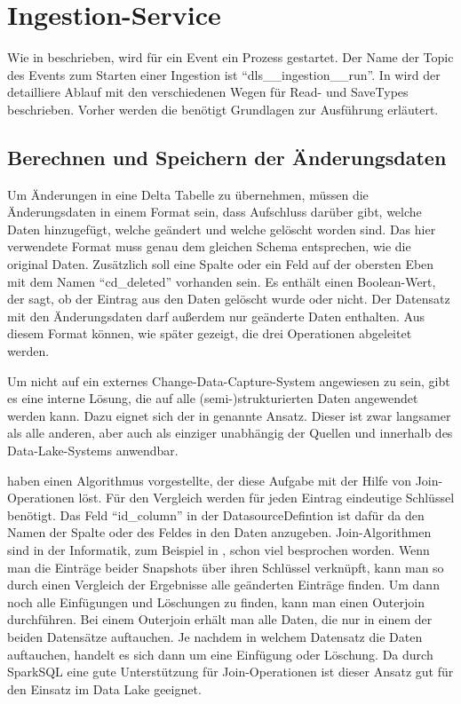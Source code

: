 \section{Ingestion-Service}

Wie in  beschrieben, wird für ein Event ein Prozess gestartet.
Der Name der Topic des Events zum Starten einer Ingestion ist "`dls\_\_ingestion\_\_run"'.
In  wird der detailliere Ablauf mit den verschiedenen Wegen für Read- und SaveTypes beschrieben.
Vorher werden die benötigt Grundlagen zur Ausführung erläutert.

\subsection{Berechnen und Speichern der Änderungsdaten}
Um Änderungen in eine Delta Tabelle zu übernehmen, müssen die Änderungsdaten in einem Format sein, dass Aufschluss darüber gibt, welche Daten hinzugefügt, welche geändert und welche gelöscht worden sind.
Das hier verwendete Format muss genau dem gleichen Schema entsprechen, wie die original Daten.
Zusätzlich soll eine Spalte oder ein Feld auf der obersten Eben mit dem Namen "`cd\_deleted"' vorhanden sein.
Es enthält einen Boolean-Wert, der sagt, ob der Eintrag aus den Daten gelöscht wurde oder nicht.
Der Datensatz mit den Änderungsdaten darf außerdem nur geänderte Daten enthalten.
Aus diesem Format können, wie später gezeigt, die drei Operationen abgeleitet werden.

Um nicht auf ein externes Change-Data-Capture-System angewiesen zu sein, gibt es eine interne Lösung, die auf alle (semi-)strukturierten Daten angewendet werden kann.
Dazu eignet sich der in  genannte Ansatz.
Dieser ist zwar langsamer als alle anderen, aber auch als einziger unabhängig der Quellen und innerhalb des Data-Lake-Systems anwendbar.

\textcite{snapshot_algos} haben einen Algorithmus vorgestellte, der diese Aufgabe mit der Hilfe von Join-Operationen löst.
Für den Vergleich werden für jeden Eintrag eindeutige Schlüssel benötigt.
Das Feld "`id\_column"' in der DatasourceDefintion ist dafür da den Namen der Spalte oder des Feldes in den Daten anzugeben.
Join-Algorithmen sind in der Informatik, zum Beispiel in \cite{joins}, schon viel besprochen worden.
Wenn man die Einträge beider Snapshots über ihren Schlüssel verknüpft, kann man so durch einen Vergleich der Ergebnisse alle geänderten Einträge finden.
Um dann noch alle Einfügungen und Löschungen zu finden, kann man einen Outerjoin durchführen.
Bei einem Outerjoin erhält man alle Daten, die nur in einem der beiden Datensätze auftauchen.
Je nachdem in welchem Datensatz die Daten auftauchen, handelt es sich dann um eine Einfügung oder Löschung.
Da durch SparkSQL eine gute Unterstützung für Join-Operationen ist dieser Ansatz gut für den Einsatz im Data Lake geeignet.

